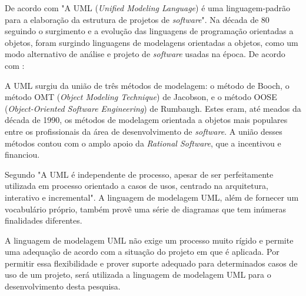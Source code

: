 		
	\par De acordo com  "A UML (\textit{Unified Modeling
Language}) é uma linguagem-padrão para a elaboração da estrutura de projetos
de \textit{software}". Na década de 80 seguindo o surgimento e a evolução das
linguagens de programação orientadas a objetos, foram surgindo linguagens de
modelagens orientadas a objetos, como um modo alternativo de análise e projeto
de \textit{software} usadas na época. De acordo com
:
	
	\begin{citacao}
		
		A UML surgiu da união de três métodos de modelagem: o método de Booch, o
		método OMT (\textit{Object Modeling Technique}) de Jacobson, e o método OOSE
		(\textit{Object-Oriented Software Engineering}) de Rumbaugh. Estes eram, até
		meados da década de 1990, os métodos de modelagem orientada a objetos mais
		populares entre os profissionais da área de desenvolvimento de
		\textit{software}. A união desses métodos contou com o amplo apoio da
		\textit{Rational Software}, que a incentivou e financiou.
	
	\end{citacao}

	\par Segundo  "A UML é independente de processo,
apesar de ser perfeitamente utilizada em processo orientado a casos de usos,
centrado na arquitetura, interativo e incremental". A linguagem de modelagem
UML, além de fornecer um vocabulário próprio, também provê uma série de
diagramas que tem inúmeras finalidades diferentes. 
	
	\par A linguagem de modelagem UML não exige um processo muito rígido e permite
uma adequação de acordo com a situação do projeto em que é aplicada. Por
permitir essa flexibilidade e prover suporte adequado para determinados casos de
uso de um projeto, será utilizada a linguagem de modelagem UML  para o
desenvolvimento desta pesquisa.